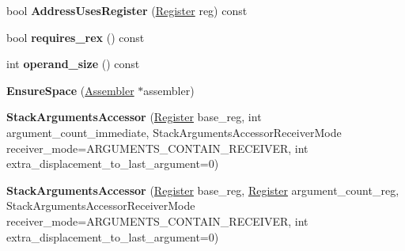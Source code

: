 \begin{DoxyCompactItemize}
\item 
bool {\bfseries Address\+Uses\+Register} (\hyperlink{structv8_1_1internal_1_1_register}{Register} reg) const \hypertarget{classv8_1_1internal_1_1_b_a_s_e___e_m_b_e_d_d_e_d_a19a1b93b16d5f333c87a03d902e731a6}{}\label{classv8_1_1internal_1_1_b_a_s_e___e_m_b_e_d_d_e_d_a19a1b93b16d5f333c87a03d902e731a6}

\item 
bool {\bfseries requires\+\_\+rex} () const \hypertarget{classv8_1_1internal_1_1_b_a_s_e___e_m_b_e_d_d_e_d_a5a660b00d3045c4145545598fb28f9b8}{}\label{classv8_1_1internal_1_1_b_a_s_e___e_m_b_e_d_d_e_d_a5a660b00d3045c4145545598fb28f9b8}

\item 
int {\bfseries operand\+\_\+size} () const \hypertarget{classv8_1_1internal_1_1_b_a_s_e___e_m_b_e_d_d_e_d_a2c07dbaea26ce5770f557e57dcccd140}{}\label{classv8_1_1internal_1_1_b_a_s_e___e_m_b_e_d_d_e_d_a2c07dbaea26ce5770f557e57dcccd140}

\item 
{\bfseries Ensure\+Space} (\hyperlink{classv8_1_1internal_1_1_assembler}{Assembler} $\ast$assembler)\hypertarget{classv8_1_1internal_1_1_b_a_s_e___e_m_b_e_d_d_e_d_a1783ae45958467ea414d65905637641f}{}\label{classv8_1_1internal_1_1_b_a_s_e___e_m_b_e_d_d_e_d_a1783ae45958467ea414d65905637641f}

\item 
{\bfseries Stack\+Arguments\+Accessor} (\hyperlink{structv8_1_1internal_1_1_register}{Register} base\+\_\+reg, int argument\+\_\+count\+\_\+immediate, Stack\+Arguments\+Accessor\+Receiver\+Mode receiver\+\_\+mode=A\+R\+G\+U\+M\+E\+N\+T\+S\+\_\+\+C\+O\+N\+T\+A\+I\+N\+\_\+\+R\+E\+C\+E\+I\+V\+ER, int extra\+\_\+displacement\+\_\+to\+\_\+last\+\_\+argument=0)\hypertarget{classv8_1_1internal_1_1_b_a_s_e___e_m_b_e_d_d_e_d_a686dadec3d933448bbd9178041169187}{}\label{classv8_1_1internal_1_1_b_a_s_e___e_m_b_e_d_d_e_d_a686dadec3d933448bbd9178041169187}

\item 
{\bfseries Stack\+Arguments\+Accessor} (\hyperlink{structv8_1_1internal_1_1_register}{Register} base\+\_\+reg, \hyperlink{structv8_1_1internal_1_1_register}{Register} argument\+\_\+count\+\_\+reg, Stack\+Arguments\+Accessor\+Receiver\+Mode receiver\+\_\+mode=A\+R\+G\+U\+M\+E\+N\+T\+S\+\_\+\+C\+O\+N\+T\+A\+I\+N\+\_\+\+R\+E\+C\+E\+I\+V\+ER, int extra\+\_\+displacement\+\_\+to\+\_\+last\+\_\+argument=0)\hypertarget{classv8_1_1internal_1_1_b_a_s_e___e_m_b_e_d_d_e_d_a01cfbff439756b39f79c0bc071ead3e5}{}\label{classv8_1_1internal_1_1_b_a_s_e___e_m_b_e_d_d_e_d_a01cfbff439756b39f79c0bc071ead3e5}


\end{DoxyCompactItemize}
